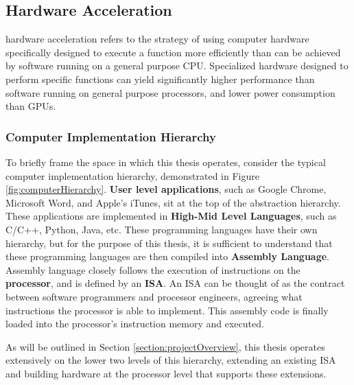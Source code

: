 
\subsection{Hardware Acceleration}
    \Gls{hardware acceleration} refers to the strategy of using computer hardware specifically designed to execute a function more efficiently than can be achieved by software running on a general purpose \gls{CPU}.
    Specialized hardware designed to perform specific functions can yield significantly higher performance than software running on general purpose processors, and lower power consumption than \gls{GPU}s.

    \subsubsection*{Computer Implementation Hierarchy}
        To briefly frame the space in which this thesis operates, consider the typical computer implementation hierarchy, demonstrated in Figure \ref{fig:computerHierarchy}. \textbf{User level applications}, such as Google Chrome, Microsoft Word, and Apple's iTunes, sit at the top of the abstraction hierarchy. These applications are implemented in \textbf{High-Mid Level Languages}, such as C/C++, Python, Java, etc. These programming languages have their own hierarchy, but for the purpose of this thesis, it is sufficient to understand that these programming languages are then compiled into \textbf{Assembly Language}. Assembly language closely follows the execution of instructions on the \textbf{processor}, and is defined by an \textbf{\gls{ISA}}. An \gls{ISA} can be thought of as the contract between software programmers and processor engineers, agreeing what instructions the processor is able to implement. This assembly code is finally loaded into the processor's instruction memory and executed. 
        
        As will be outlined in Section \ref{section:projectOverview}, this thesis operates extensively on the lower two levels of this hierarchy, extending an existing \gls{ISA} and building hardware at the processor level that supports these extensions.

